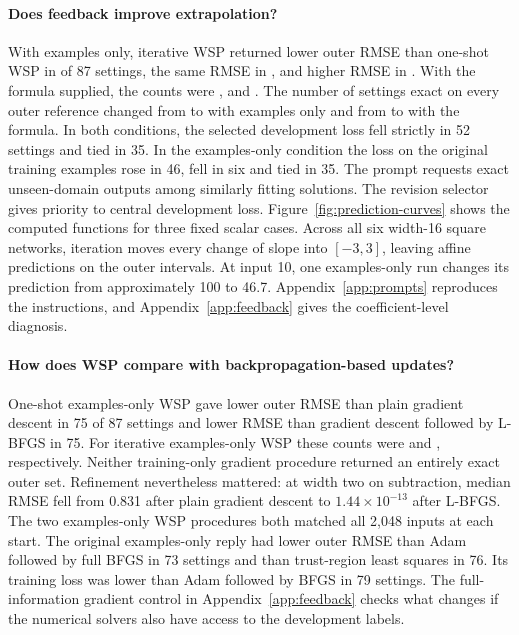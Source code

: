 \paragraph{Does feedback improve extrapolation?}
With examples only, iterative WSP returned lower outer RMSE than one-shot WSP in \iterBetterE{} of 87 settings, the same RMSE in \iterTieE{}, and higher RMSE in \iterWorseE{}. With the formula supplied, the counts were \iterBetterF{}, \iterTieF{} and \iterWorseF{}. The number of settings exact on every outer reference changed from \oldPerfectE{} to \iterPerfectE{} with examples only and from \oldPerfectF{} to \iterPerfectF{} with the formula. In both conditions, the selected development loss fell strictly in 52 settings and tied in 35. In the examples-only condition the loss on the original training examples rose in 46, fell in six and tied in 35. The prompt requests exact unseen-domain outputs among similarly fitting solutions. The revision selector gives priority to central development loss. Figure~\ref{fig:prediction-curves} shows the computed functions for three fixed scalar cases. Across all six width-16 square networks, iteration moves every change of slope into $[-3,3]$, leaving affine predictions on the outer intervals. At input 10, one examples-only run changes its prediction from approximately 100 to 46.7. Appendix~\ref{app:prompts} reproduces the instructions, and Appendix~\ref{app:feedback} gives the coefficient-level diagnosis.

\paragraph{How does WSP compare with backpropagation-based updates?}
One-shot examples-only WSP gave lower outer RMSE than plain gradient descent in 75 of 87 settings and lower RMSE than gradient descent followed by L-BFGS in 75. For iterative examples-only WSP these counts were \vsGDE{} and \vsGLE{}, respectively. Neither training-only gradient procedure returned an entirely exact outer set. Refinement nevertheless mattered: at width two on subtraction, median RMSE fell from 0.831 after plain gradient descent to $1.44\times10^{-13}$ after L-BFGS. The two examples-only WSP procedures both matched all 2,048 inputs at each start. The original examples-only reply had lower outer RMSE than Adam followed by full BFGS in 73 settings and than trust-region least squares in 76. Its training loss was lower than Adam followed by BFGS in 79 settings. The full-information gradient control in Appendix~\ref{app:feedback} checks what changes if the numerical solvers also have access to the development labels.

